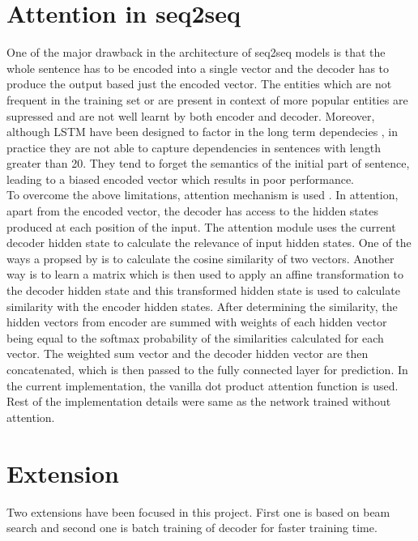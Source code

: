 \documentclass[11pt,a4paper]{article}
\begin{document}
\section{Attention in seq2seq}
One of the major drawback in the architecture of seq2seq models is that the whole sentence has to be encoded into a single vector and the decoder has to produce the output based just the encoded vector. The entities which are not frequent in the training set or are present in context of more popular entities are supressed and are not well learnt by both encoder and decoder. Moreover, although LSTM have been designed to factor in the long term dependecies , in practice they are not able to capture dependencies in sentences with length greater than 20. They tend to forget the semantics of the initial part of sentence, leading to a biased encoded vector which results in poor performance. \\
To overcome the above limitations, attention mechanism is used . In attention, apart from the encoded vector, the decoder has access to the hidden states produced at each position of the input. The attention module uses the current decoder hidden state to calculate the relevance of input hidden states. One of the ways a propsed by \cite{luong2015effective} is to calculate the cosine similarity of two vectors. Another way is to learn a matrix which is then used to apply an affine transformation to the decoder hidden state and this transformed hidden state is used to calculate similarity with the encoder hidden states. After determining the similarity, the hidden vectors from encoder are summed with weights of each hidden vector being equal to the softmax probability of the similarities calculated for each vector. The weighted sum vector and the decoder hidden vector are then concatenated, which is then passed to the fully connected layer for prediction. In the current implementation, the vanilla dot product attention function is used. Rest of the implementation details were same as the network trained without attention. 
\section{Extension}
Two extensions have been focused in this project. First one is based on beam search and second one is batch training of decoder for faster training time.
\end{document}
